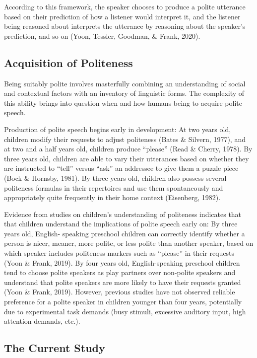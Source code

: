 \documentclass[
  english,
  man,floatsintext]{apa6}
\begin{document}
According to this framework, the speaker chooses to produce a polite utterance based on their prediction of how a listener would interpret it, and the listener being reasoned about interprets the utterance by reasoning about the speaker's prediction, and so on (Yoon, Tessler, Goodman, \& Frank, 2020).

\hypertarget{acquisition-of-politeness}{%
\subsection{Acquisition of Politeness}\label{acquisition-of-politeness}}

Being suitably polite involves masterfully combining an understanding of social and contextual factors with an inventory of linguistic forms. The complexity of this ability brings into question when and how humans being to acquire polite speech.

Production of polite speech begins early in development: At two years old, children modify their requests to adjust politeness (Bates \& Silvern, 1977), and at two and a half years old, children produce ``please'' (Read \& Cherry, 1978). By three years old, children are able to vary their utterances based on whether they are instructed to ``tell'' versus ``ask'' an addressee to give them a puzzle piece (Bock \& Hornsby, 1981). By three years old, children also possess several politeness formulas in their repertoires and use them spontaneously and appropriately quite frequently in their home context (Eisenberg, 1982).

Evidence from studies on children's understanding of politeness indicates that that children understand the implications of polite speech early on: By three years old, English- speaking preschool children can correctly identify whether a person is nicer, meaner, more polite, or less polite than another speaker, based on which speaker includes politeness markers such as ``please'' in their requests (Yoon \& Frank, 2019). By four years old, English-speaking preschool children tend to choose polite speakers as play partners over non-polite speakers and understand that polite speakers are more likely to have their requests granted (Yoon \& Frank, 2019). However, previous studies have not observed reliable preference for a polite speaker in children younger than four years, potentially due to experimental task demands (busy stimuli, excessive auditory input, high attention demands, etc.).

\hypertarget{the-current-study}{%
\subsection{The Current Study}\label{the-current-study}}
\end{document}
